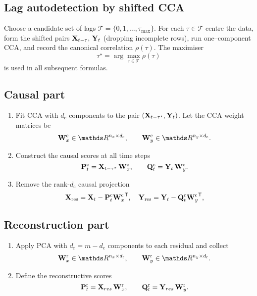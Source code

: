 \documentclass[14pt]{extarticle}
\begin{document}
	\subsection*{Lag autodetection by shifted CCA}
	
	Choose a candidate set of lags
	\(\mathcal{T}=\{0,1,\dots,\tau_{\max}\}\).  
	For each \(\tau\in\mathcal{T}\) centre the data,
	form the shifted pairs
	\(\mathbf{X}_{t-\tau},\,\mathbf{Y}_t\) (dropping incomplete rows), run one–component
	CCA, and record the canonical correlation \(\rho(\tau)\).  
	The maximiser
	\[
	\tau^{\star}=\arg\max_{\tau\in\mathcal{T}}\rho(\tau)
	\]
	is used in all subsequent formulas.
	
	\subsection*{Causal part}
	
	\begin{enumerate}[leftmargin=1.4cm,label=(C\arabic*)]
		\item
		Fit CCA with \(d_{\mathrm c}\) components to the
		pair \((\mathbf{X}_{t-\tau^{\star}},\mathbf{Y}_t)\).  
		Let the CCA weight matrices be
		\[
		\bW_x^{\mathrm c}\in\dR^{n_x\times d_{\mathrm c}},
		\qquad
		\bW_y^{\mathrm c}\in\dR^{n_y\times d_{\mathrm c}}.
		\]
		\item
		Construct the causal scores at all time steps
		\[
		\mathbf{P}_t^{\mathrm c}= \mathbf{X}_{t-\tau^{\star}}\,\mathbf{W}_x^{\mathrm c},
		\qquad
		\mathbf{Q}_t^{\mathrm c}= \mathbf{Y}_t\,\mathbf{W}_y^{\mathrm c}.
		\]
		\item Remove the rank-\(d_{\mathrm c}\) causal projection
		\[
		\mathbf{X}_{\text{res}}
		= \mathbf{X}_t - \mathbf{P}_t^{\mathrm c}{\mathbf{W}_x^{\mathrm c}}^{\mathsf{T}},\quad
		\mathbf{Y}_{\text{res}}
		= \mathbf{Y}_t - \mathbf{Q}_t^{\mathrm c}{\mathbf{W}_y^{\mathrm c}}^{\mathsf{T}},
		\]
	\end{enumerate}
	
	\subsection*{Reconstruction part}
	
	\begin{enumerate}[leftmargin=1.4cm,label=(R\arabic*)]
		\item
		Apply PCA with \(d_{\mathrm r}=m-d_{\mathrm c}\) components to each
		residual and collect
		\[
		\bW_x^{\mathrm r}\in\dR^{n_x\times d_{\mathrm r}},
		\qquad
		\bW_y^{\mathrm r}\in\dR^{n_y\times d_{\mathrm r}}.
		\]
		\item
		Define the reconstructive scores
		\[
		\mathbf{P}_t^{\mathrm r}= \mathbf{X}_{res}\,\mathbf{W}_x^{\mathrm r},
		\qquad
		\mathbf{Q}_t^{\mathrm r}= \mathbf{Y}_{res}\,\mathbf{W}_y^{\mathrm r}.
		\]
	\end{enumerate}
	
\end{document}
